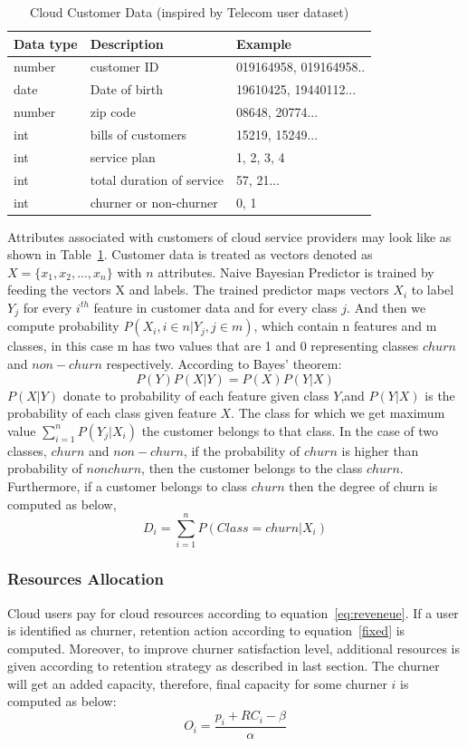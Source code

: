 \begin{table}[!h]
\caption{Cloud Customer Data (inspired by Telecom user dataset)}
\label{table1}
\centering
\begin{tabular}{|p{1.1cm}|p{3cm}|p{3cm}|}
\hline
\hline
Data type&Description&Example\\
\hline
\hline
number&customer ID&019164958, 019164958..\\
\hline
date&Date of birth&19610425, 19440112...\\
\hline
number&zip code&08648, 20774...\\
\hline
int&bills of customers&15219, 15249...\\
\hline
int&service plan&1, 2, 3, 4\\
\hline
int&total duration of service&57, 21...\\
\hline
int&churner or non-churner&0, 1\\
\hline
\end{tabular}
\end{table}
Attributes associated with customers of cloud service providers may look like as shown in Table~\ref{table1}. Customer data is treated as vectors denoted as $X=\{x_1,x_2,...,x_n\}$  with $n$ attributes. Naive Bayesian Predictor is trained by feeding the vectors X and labels. The trained predictor maps vectors $X_i$ to label $Y_j$ for every $i^{th}$ feature in customer data and for every class $j$. And then we compute probability $P(X_i,i\in n|Y_j, j\in m)$, which contain n features and m classes, in this case m has two values that are 1 and 0 representing classes $churn$ and $non-churn$ respectively. According to Bayes' theorem:
\begin{equation*}
P(Y)P(X|Y)=P(X)P(Y|X)
\end{equation*}
$P(X|Y)$ donate to probability of each feature given class $Y$,and $P(Y|X)$ is the probability of each class given feature $X$. The class for which we get maximum value $\sum_{i=1}^n P(Y_j|X_i)$ the customer belongs to that class. In the case of two classes, $churn$ and $non-churn$,  if the probability of $churn$ is higher than probability of $nonchurn$, then the customer belongs to the class $churn$. Furthermore, if a customer belongs to class $churn$ then the degree of churn is computed as below,
\begin{equation}
D_i=\sum_{i=1}^n P(Class=churn|X_i) 
\label{eq:degchurn}
\end{equation}

\subsubsection{Resources Allocation}
Cloud users pay for cloud resources according to equation~\ref{eq:reveneue}. If a user is identified as churner, retention action according to equation~\ref{fixed} is computed. Moreover, to improve churner satisfaction level, additional resources is given according to retention strategy as described in last section. The churner will get an added capacity, therefore, final capacity for some churner $i$ is computed as below:
\begin{equation*}
O_{i}=\dfrac{p_{i}+RC_{i}-\beta}{\alpha}
\end{equation*}

